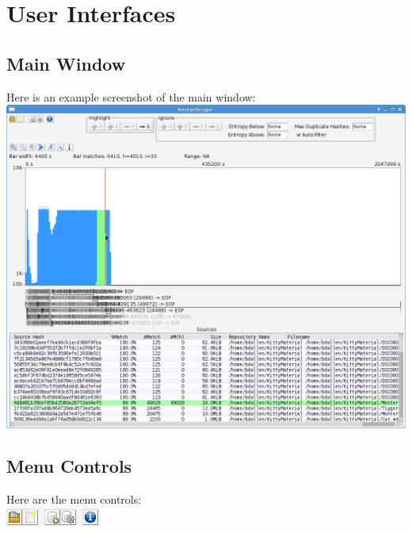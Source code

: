 \documentclass[11pt,fleqn]{article} %
\begin{document}
\section{\sscope User Interfaces}
\subsection{Main Window}
Here is an example screenshot of the \sscope main window:\\
\includegraphics[scale=.4]{screenshots/main_window}\\

\subsection{Menu Controls}
Here are the menu controls:\\
\includegraphics[scale=.4]{screenshots/menu_controls}\\
\end{document}
